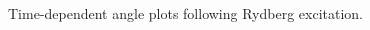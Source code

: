 \documentclass{beamer}
\begin{document}
\begin{frame}
\begin{columns}
\begin{column}{.6\textwidth}
\begin{figure}[H]
				\caption{Time-dependent angle plots
					following Rydberg excitation.}
				\label{fig:nmm-geom}
			\end{figure}
		\end{column}%
		
	\end{columns}
\end{frame}



%	
%	

%	
%

\end{document}
